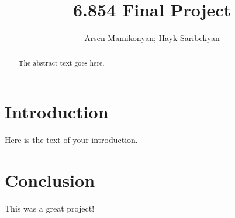 \documentclass{article}
\begin{document}
\title{6.854 Final Project}
\author{Arsen Mamikonyan; Hayk Saribekyan}


\maketitle

\begin{abstract}
The abstract text goes here.
\end{abstract}

\section{Introduction}
Here is the text of your introduction.

\section{Conclusion}
This was a great project!
\end{document}
